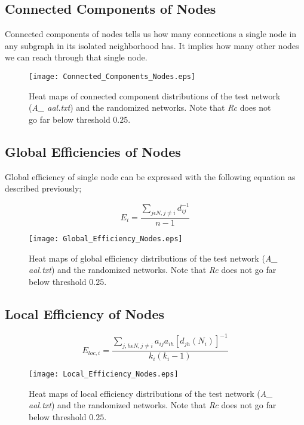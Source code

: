 \documentclass[12pt]{article}
\begin{document}
\newpage

\subsection{Connected Components of Nodes}
Connected components of nodes tells us how many connections a single node in any subgraph in its isolated neighborhood has. It implies how many other nodes we can reach through that single node. 

\begin{figure}[h!]
	\centering
	\texttt{[image: Connected\_Components\_Nodes.eps]}
	\caption{Heat maps of connected component distributions of the test network (\textit{A\_ aal.txt}) and the randomized networks. Note that \textit{Rc} does not go far below threshold $0.25$.}
\end{figure}

\newpage

\subsection{Global Efficiencies of Nodes}
Global efficiency of single node can be expressed with the following equation as described previously; 

\begin{equation}
 E_i =  \frac{\sum\limits_{j \epsilon N, j\neq i}d_{ij}^{-1}}{n-1 }
\end{equation}

\begin{figure}[h!]
	\centering
	\texttt{[image: Global\_Efficiency\_Nodes.eps]}
	\caption{Heat maps of global efficiency distributions of the test network (\textit{A\_ aal.txt}) and the randomized networks. Note that \textit{Rc} does not go far below threshold $0.25$.}
\end{figure}

\newpage 

\subsection{Local Efficiency of Nodes}

\begin{equation}
 E_{loc,i} = \frac{\sum\limits_{j,h \epsilon N, j\neq i} a_{ij} a_{ih}[d_{jh}(N_i)]^{-1}}{k_i(k_i - 1) }
\end{equation}

\begin{figure}[h!]
	\centering
	\texttt{[image: Local\_Efficiency\_Nodes.eps]}
	\caption{Heat maps of local efficiency distributions of the test network (\textit{A\_ aal.txt}) and the randomized networks. Note that \textit{Rc} does not go far below threshold $0.25$.}
\end{figure}
\end{document}
